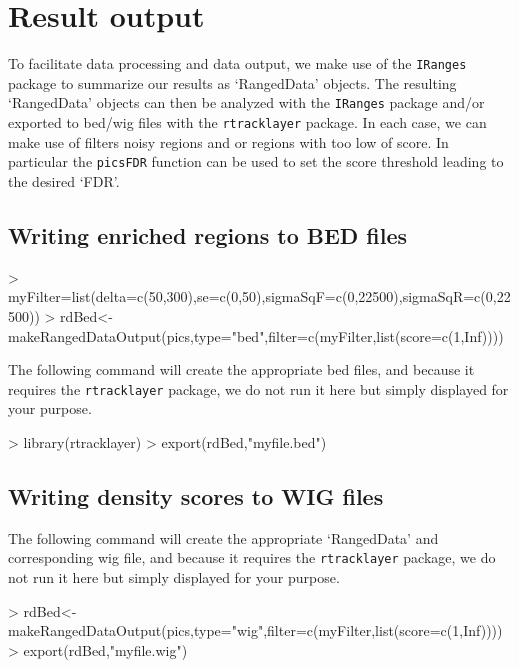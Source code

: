 \documentclass[a4paper]{article}
\begin{document}
\section{Result output}

To facilitate data processing and data output, we make use of the \texttt{IRanges} package to summarize our results as `RangedData' objects. The resulting `RangedData' objects can then be analyzed with the \texttt{IRanges} package and/or exported to bed/wig files with the \texttt{rtracklayer} package. In each case, we can make use of filters noisy regions and or regions with too low of score. In particular the \texttt{picsFDR} function can be used to set the score threshold leading to the desired `FDR'.

\subsection{Writing enriched regions to BED files}

\begin{Schunk}
\begin{Sinput}
> myFilter=list(delta=c(50,300),se=c(0,50),sigmaSqF=c(0,22500),sigmaSqR=c(0,22500))
> rdBed<-makeRangedDataOutput(pics,type="bed",filter=c(myFilter,list(score=c(1,Inf))))
\end{Sinput}
\end{Schunk}
The following command will create the appropriate bed files, and because it requires the \texttt{rtracklayer} package, we do not run it here but simply displayed for your purpose.
\begin{Schunk}
\begin{Sinput}
> library(rtracklayer)
> export(rdBed,"myfile.bed")
\end{Sinput}
\end{Schunk}

\subsection{Writing density scores to WIG files}
The following command will create the appropriate `RangedData' and corresponding wig file, and because it requires the \texttt{rtracklayer} package, we do not run it here but simply displayed for your purpose.

\begin{Schunk}
\begin{Sinput}
> rdBed<-makeRangedDataOutput(pics,type="wig",filter=c(myFilter,list(score=c(1,Inf))))
> export(rdBed,"myfile.wig")
\end{Sinput}
\end{Schunk}
\end{document}
